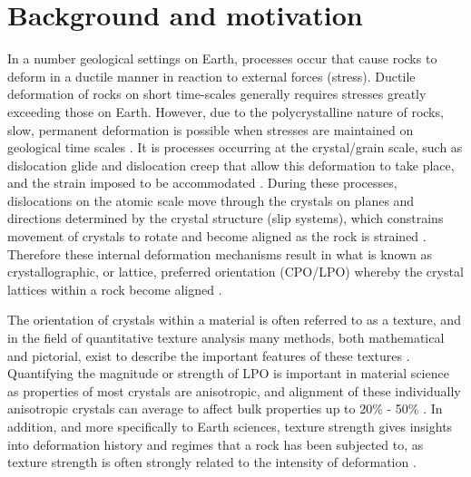\documentclass[a4paper,12pt,twoside]{report}
\numberwithin{equation}{chapter}
\begin{document}
\section{Background and motivation} \label{sec:background}
In a number geological settings on Earth, processes occur that cause rocks to deform in a ductile manner in reaction to external forces (stress). Ductile deformation of rocks on short time-scales generally requires stresses greatly exceeding those on Earth. However, due to the polycrystalline nature of rocks, slow, permanent deformation is possible when stresses are maintained on geological time scales \citep{Weiss1985}. It is processes occurring at the crystal/grain scale, such as dislocation glide and dislocation creep that allow this deformation to take place, and the strain imposed to be accommodated \citep{Ashby1972}. During these processes, dislocations on the atomic scale move through the crystals on planes and directions determined by the crystal structure (slip systems), which constrains movement of crystals to rotate and become aligned as the rock is strained \citep{Goulding2015}. Therefore these internal deformation mechanisms result in what is known as crystallographic, or lattice, preferred orientation (CPO/LPO) whereby the crystal lattices within a rock become aligned \citep{Price1985}.   

The orientation of crystals within a material is often referred to as a texture, and in the field of quantitative texture analysis many methods, both mathematical and pictorial, exist to describe the important features of these textures \citep[for introductory texts see][]{bunge1982texture,Bunge1985,Randle2000,Mainprice}. Quantifying the magnitude or strength of LPO is important in material science as properties of most crystals are anisotropic, and alignment of these individually anisotropic crystals can average to affect bulk properties up to 20\% - 50\% \citep{Randle2000}. In addition, and more specifically to Earth sciences, texture strength gives insights into deformation history and regimes that a rock has been subjected to, as texture strength is often strongly related to the intensity of deformation \citep{Weiss1985}.
\end{document}
